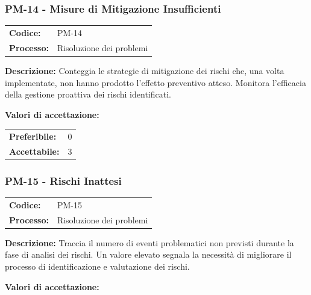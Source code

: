 \documentclass[a4paper,11pt,oneside]{scrartcl}
\begin{document}
\subsubsection{PM-14 - Misure di Mitigazione Insufficienti}

\noindent
\begin{tabular}{@{}p{}p{}@{}}
\textbf{Codice:} & PM-14 \\
\textbf{Processo:} & Risoluzione dei problemi \\
\end{tabular}

\vspace{0.3cm}
\noindent\textbf{Descrizione:} Conteggia le strategie di mitigazione{\scriptsize{}} dei rischi che, una volta implementate, non hanno prodotto l'effetto preventivo atteso. Monitora l'efficacia della gestione proattiva dei rischi identificati.

\vspace{0.2cm}
\noindent\textbf{Valori di accettazione:}
\vspace{0.1cm}

\noindent
\begin{tabular}{@{}ll@{}}
\textbf{Preferibile:} & $0$ \\
\textbf{Accettabile:} & $3$ \\
\end{tabular}

\subsubsection{PM-15 - Rischi Inattesi}

\noindent
\begin{tabular}{@{}p{}p{}@{}}
\textbf{Codice:} & PM-15 \\
\textbf{Processo:} & Risoluzione dei problemi \\
\end{tabular}

\vspace{0.3cm}
\noindent\textbf{Descrizione:} Traccia il numero di eventi problematici non previsti durante la fase di analisi dei rischi. Un valore elevato segnala la necessità di migliorare il processo di identificazione e valutazione dei rischi.

\vspace{0.2cm}
\noindent\textbf{Valori di accettazione:}
\vspace{0.1cm}
\end{document}
